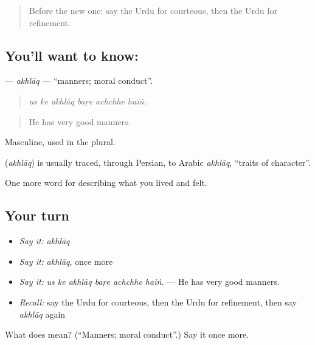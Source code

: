 \begin{quote}
Before the new one: say the Urdu for courteous, then the Urdu for refinement.
\end{quote}

\subsection*{You'll want to know: }
\textbf{} — \emph{akhlāq} — \textquotedblleft{}manners; moral conduct\textquotedblright{}.

\begin{quote}
     
\end{quote}

\begin{quote}
\emph{us ke akhlāq baṛe achchhe haiṅ.}
\end{quote}

\begin{quote}
He has very good manners.
\end{quote}

Masculine, used in the plural.

\begin{cousinweb}
\textbf{} (\emph{akhlāq}) is usually traced, through Persian, to Arabic \emph{akhlāq}, \textquotedblleft{}traits of character\textquotedblright{}.
\end{cousinweb}

\begin{grammarlens}[title={What you've built}]
One more word for describing what you lived and felt.
\end{grammarlens}

\subsection*{Your turn}
\begin{itemize}
\raggedright
  \item \emph{Say it:} \emph{akhlāq}
  \item \emph{Say it:} \emph{akhlāq}, once more
  \item \emph{Say it:} \emph{us ke akhlāq baṛe achchhe haiṅ.} — He has very good manners.
  \item \emph{Recall:} say the Urdu for courteous, then the Urdu for refinement, then say \emph{akhlāq} again
\end{itemize}

\begin{tcolorbox}[breakable,colback=teal!4,colframe=teal!35!black,title={Before you move on}]
What does  mean? (\textquotedblleft{}Manners; moral conduct\textquotedblright{}.) Say it once more.
\end{tcolorbox}
